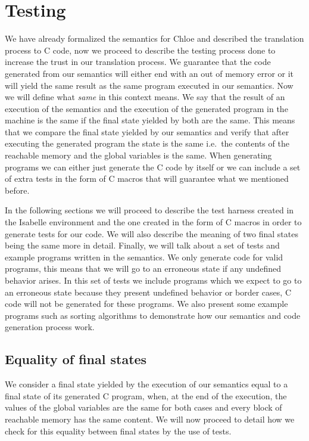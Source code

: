 \chapter{Testing}\label{chapter:testing}

We have already formalized the semantics for Chloe and described the translation process to C code, now we proceed to describe the testing process done to increase the trust in our translation process.
We guarantee that the code generated from our semantics will either end with an out of memory error or it will yield the same result as the same program executed in our semantics.
Now we will define what \textit{same} in this context means.
We say that the result of an execution of the semantics and the execution of the generated program in the machine is the same if the final state yielded by both are the same.
This means that we compare the final state yielded by our semantics and verify that after executing the generated program the state is the same i.e.\ the contents of the reachable memory and the global variables is the same.
When generating programs we can either just generate the C code by itself or we can include a set of extra tests in the form of C macros that will guarantee what we mentioned before.

In the following sections we will proceed to describe the test harness created in the Isabelle environment and the one created in the form of C macros in order to generate tests for our code.
We will also describe the meaning of two final states being the same more in detail.
Finally, we will talk about a set of tests and example programs written in the semantics.
We only generate code for valid programs, this means that we will go to an erroneous state if any undefined behavior arises.
In this set of tests we include programs which we expect to go to an erroneous state because they present undefined behavior or border cases, C code will not be generated for these programs.
We also present some example programs such as sorting algorithms to demonstrate how our semantics and code generation process work.


\section{Equality of final states}

We consider a final state yielded by the execution of our semantics equal to a final state of its generated C program, when, at the end of the execution, the values of the global variables are the same for both cases and every block of reachable memory has the same content.
We will now proceed to detail how we check for this equality between final states by the use of tests.

